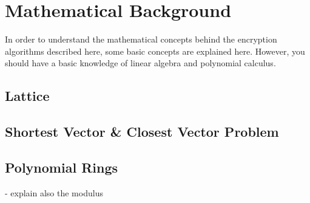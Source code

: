 \chapter{Mathematical Background}
\label{MathBack}

In order to understand the mathematical concepts behind the encryption algorithms described here, some basic concepts are explained here. However, you should have a basic knowledge of linear algebra and polynomial calculus.

\section{Lattice}

\section{Shortest Vector \& Closest Vector Problem}

\section{Polynomial Rings}
- explain also the modulus


